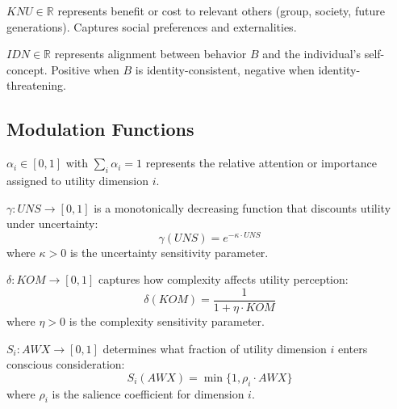\begin{definition}
\label{def:knu}
$KNU \in \mathbb{R}$ represents benefit or cost to relevant others (group, society, future generations). Captures social preferences and externalities.
\end{definition}

\begin{definition}
\label{def:idn}
$IDN \in \mathbb{R}$ represents alignment between behavior $B$ and the individual's self-concept. Positive when $B$ is identity-consistent, negative when identity-threatening.
\end{definition}


\subsection{Modulation Functions}

\begin{definition}
\label{def:alpha}
$\alpha_i \in [0,1]$ with $\sum_i \alpha_i = 1$ represents the relative attention or importance assigned to utility dimension $i$.
\end{definition}

\begin{definition}
\label{def:gamma}
$\gamma: UNS \rightarrow [0,1]$ is a monotonically decreasing function that discounts utility under uncertainty:
\begin{equation}
\gamma(UNS) = e^{-\kappa \cdot UNS}
\end{equation}
where $\kappa > 0$ is the uncertainty sensitivity parameter.
\end{definition}

\begin{definition}
\label{def:delta}
$\delta: KOM \rightarrow [0,1]$ captures how complexity affects utility perception:
\begin{equation}
\delta(KOM) = \frac{1}{1 + \eta \cdot KOM}
\end{equation}
where $\eta > 0$ is the complexity sensitivity parameter.
\end{definition}

\begin{definition}
\label{def:salience}
$S_i: AWX \rightarrow [0,1]$ determines what fraction of utility dimension $i$ enters conscious consideration:
\begin{equation}
S_i(AWX) = \min\{1, \rho_i \cdot AWX\}
\end{equation}
where $\rho_i$ is the salience coefficient for dimension $i$.
\end{definition}

